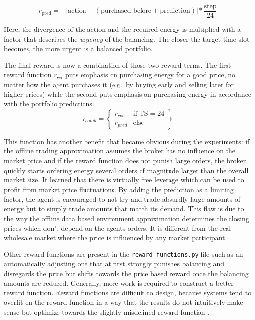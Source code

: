 \begin{equation}
    r_{\text{pred}} = - | \text{action} - (\text{purchased before} + \text{prediction}) | * \frac{\text{step}}{24}
\end{equation}

Here, the divergence of the action and the required energy is multiplied with a factor that describes the \emph{urgency}
of the balancing. The closer the target time slot becomes, the more urgent is a balanced portfolio.

The final reward is now a combination of those two reward terms. The first reward function $r_{rel}$ puts emphasis on purchasing
energy for a good price, no matter how the agent purchases it (e.g.\ by buying early and selling later for higher
prices) while the second puts emphasis on purchasing energy in accordance with the portfolio predictions.
\begin{equation}
    r_{comb} = \left\{
        \begin{array}{lr}
            r_{rel} & \text{if TS} = 24 \\
            r_{pred} & \text{else}
        \end{array}
    \right\}
\end{equation}

This function has another benefit that became obvious during the experiments: if the offline trading approximation
assumes the broker has no influence on the market price and if the reward function does not punish large orders, the
broker quickly starts ordering energy several orders of magnitude larger than the overall market size. It learned that
there is virtually free leverage which can be used to profit from market price fluctuations. By adding the
prediction as a limiting factor, the agent is encouraged to not try and trade absurdly large amounts of energy but to
simply trade amounts that match its demand. This flaw is due to the way the offline data based environment approximation
determines the closing prices which don't depend on the agents orders. It is different from the real wholesale market
where the price is influenced by any market participant.

Other reward functions are present in the \texttt{reward\_functions.py} file such as an automatically adjusting one that
at first strongly punishes balancing and disregards the price but shifts towards the price based reward once the
balancing amounts are reduced. Generally, more work is required to construct a better reward function.
Reward functions are difficult to design, because systems tend to overfit on the reward function in a way that the
results do not intuitively make sense but optimize towards the slightly misdefined reward function
\citep{amodei2016concrete}.

